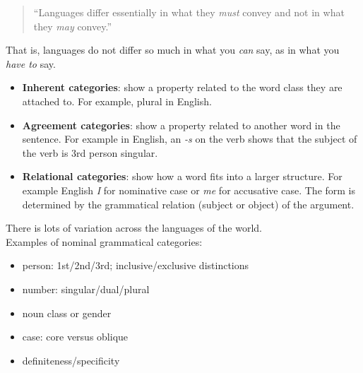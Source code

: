 \documentclass[a4paper,landscape,headrule,footrule]{foils}
\begin{document}
\begin{quote}
  ``Languages differ essentially in what they \textit{must} convey and not
  in what they \textit{may} convey.''
  \hfill \citep[p.~236]{jakobson:1959}
\end{quote}

That is, languages do not differ so much in what you \emph{can} say, as in
what you \emph{have to} say.
	
  \begin{itemize}
  \item
    \textbf{Inherent categories}: show a property related to the word class they are attached to.  For example, plural in English.
  \item
    \textbf{Agreement categories}: show a property related to another word in the sentence.  For example in English, an \emph{-s} on the verb shows that the subject of the verb is 3rd person singular.
   \item
  \textbf{Relational categories}: show how a word fits into a larger structure.  For example English  \emph{I} for nominative case or \emph{me} for accusative case. The  form is determined by the grammatical relation (subject or object) of the argument.
  \end{itemize}

  There is lots of variation across the languages of the world.\\
\vspace{3mm}
Examples of nominal grammatical categories:
  \begin{itemize}
  \item
    person: 1st/2nd/3rd; inclusive/exclusive distinctions
  \item
  number: singular/dual/plural
  \item
 noun class or gender
  \item
case: core versus oblique
  \item
definiteness/specificity
  \end{itemize}

\end{document}
